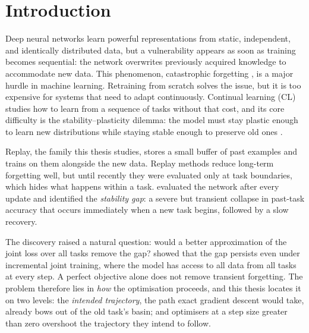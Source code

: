 \section{Introduction}
\label{sec:introduction}

Deep neural networks learn powerful representations from static, independent, and identically distributed data, but a vulnerability appears as soon as training becomes sequential: the network overwrites previously acquired knowledge to accommodate new data. This phenomenon, catastrophic forgetting \cite{mccloskey:catastrophic, ratclif1990catastrophicforgetting}, is a major hurdle in machine learning. Retraining from scratch solves the issue, but it is too expensive for systems that need to adapt continuously. Continual learning (CL) studies how to learn from a sequence of tasks without that cost, and its core difficulty is the stability--plasticity dilemma: the model must stay plastic enough to learn new distributions while staying stable enough to preserve old ones \cite{Mermillod2013Stability-Plasticity}.

Replay, the family this thesis studies, stores a small buffer of past examples and trains on them alongside the new data. Replay methods reduce long-term forgetting well, but until recently they were evaluated only at task boundaries, which hides what happens within a task. \citet{delange2023continualevaluationlifelonglearning} evaluated the network after every update and identified the \emph{stability gap}: a severe but transient collapse in past-task accuracy that occurs immediately when a new task begins, followed by a slow recovery.

The discovery raised a natural question: would a better approximation of the joint loss over all tasks remove the gap? \citet{hess2024complementaryperspectivescontinuallearning} showed that the gap persists even under incremental joint training, where the model has access to all data from all tasks at every step. A perfect objective alone does not remove transient forgetting. The problem therefore lies in \emph{how} the optimisation proceeds, and this thesis locates it on two levels: the \emph{intended trajectory}, the path exact gradient descent would take, already bows out of the old task's basin; and optimisers at a step size greater than zero overshoot the trajectory they intend to follow.

